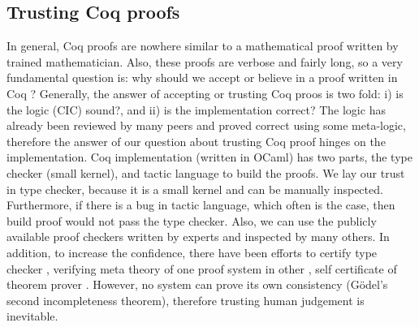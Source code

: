  \subsection{Trusting Coq proofs}
 \label{sec:coqproof}
  In general, Coq proofs are nowhere similar to a mathematical 
  proof written by trained mathematician. Also, these proofs 
  are verbose and fairly long, so a 
  very fundamental question is: why should we 
  accept or believe in a proof written in Coq \citep{pollack1998believe}?  Generally, the answer of 
	accepting or trusting Coq proos is two fold:
  i) is the logic (CIC) sound?, and ii) is the implementation correct?
  The logic has already been reviewed by many peers and proved correct 
  using some meta-logic, therefore the answer of our question about trusting Coq proof 
  hinges on the implementation. 
  Coq implementation (written in OCaml)  has two parts, the type checker (small kernel), 
  and tactic language to build the proofs.
  We lay our trust in type checker, because it is a small kernel and can be 
  manually inspected. Furthermore, if there
  is a bug in tactic language, which often is the case, then build proof would 
  not pass the type checker.  Also, we can use the publicly available proof 
  checkers written by experts and inspected by many others. In addition, to increase the 
  confidence, there have been 
  efforts to certify type checker \citep{Appel2003}
  \citep{barras1996coq}, verifying meta theory of one proof system 
  in other \citep{10.1007/978-3-319-08970-6_3}, self certificate of 
  theorem prover \citep{10.1007/11814771_17}. However, no system can 
  prove its own consistency (G{\"o}del's second incompleteness theorem), therefore
  trusting human judgement is inevitable.
  
 
